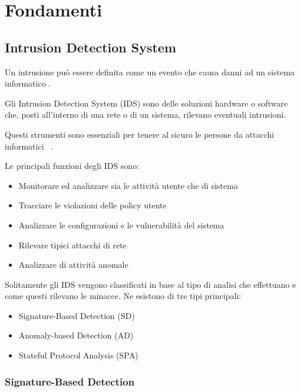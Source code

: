 \chapter{Fondamenti}

\section{Intrusion Detection System}


Un intrusione può essere definita come un evento che causa danni ad un sistema informatico \cite{SurveyIntrusionDetection2019}.

Gli Intrusion Detection System (IDS) sono delle soluzioni hardware o software che, posti all'interno di una rete o di un sistema, rilevano eventuali intrusioni. 

Questi strumenti sono essenziali per tenere al sicuro le persone da attacchi informatici ~\cite{SurveyIntrusionDetection2019}.

\cite{ashoorImportanceIntrusionDetection2010} Le principali funzioni degli IDS sono: 

\begin{itemize}
    \item Monitorare ed analizzare sia le attività utente che di sistema
    \item Tracciare le violazioni delle policy utente
    \item Analizzare le configurazioni e le vulnerabilità del sistema
    \item Rilevare tipici attacchi di rete
    \item Analizzare di attività anomale
\end{itemize}


\cite{liaoIntrusionDetectionSystem2013} Solitamente gli IDS vengono classificati in base al tipo di analisi che effettuano e come questi rilevano le minacce. Ne esistono di tre tipi principali:


\begin{itemize}
    \item Signature-Based Detection (SD)
    \item Anomaly-based Detection (AD)
    \item Stateful Protocol Analysis (SPA)
\end{itemize}



\subsection{Signature-Based Detection}

